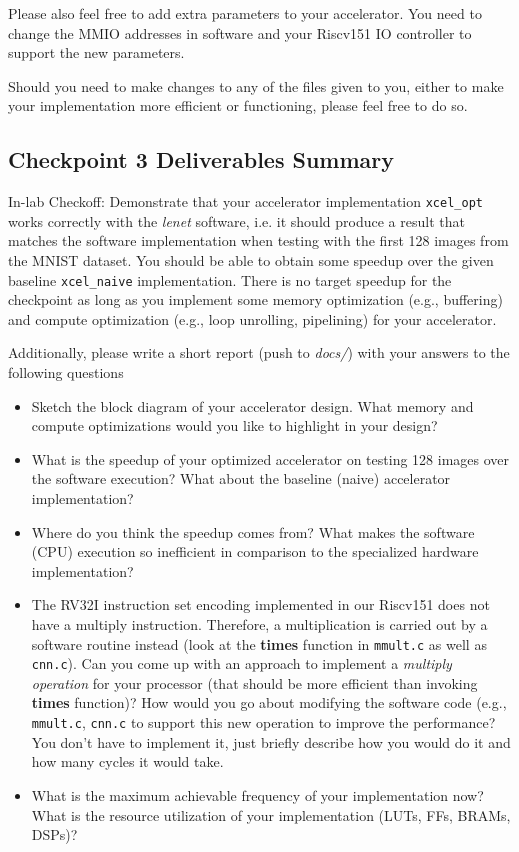 \documentclass[11pt]{article}
\begin{document}
Please also feel free to add extra parameters to your accelerator. You need to change the MMIO addresses in software and your Riscv151 IO controller to support the new parameters.

Should you need to make changes to any of the files given to you, either to make your implementation more efficient or functioning, please feel free to do so.

\newpage
\subsection{Checkpoint 3 Deliverables Summary}

In-lab Checkoff: Demonstrate that your accelerator implementation \verb|xcel_opt| works correctly with the \textit{lenet} software, i.e. it should produce a result that matches the software implementation when testing with the first 128 images from the MNIST dataset. You should be able to obtain some speedup over the given baseline \verb|xcel_naive| implementation. There is no target speedup for the checkpoint as long as you implement some memory optimization (e.g., buffering) and compute optimization (e.g., loop unrolling, pipelining) for your accelerator.

Additionally, please write a short report (push to \textit{docs/}) with your answers to the following questions
\begin{itemize}
\item Sketch the block diagram of your accelerator design. What memory and compute optimizations would you like to highlight in your design?
\item What is the speedup of your optimized accelerator on testing 128 images over the software execution? What about the baseline (naive) accelerator implementation?
\item Where do you think the speedup comes from? What makes the software (CPU) execution so inefficient in comparison to the specialized hardware implementation?
\item The RV32I instruction set encoding implemented in our Riscv151 does not have a multiply instruction. Therefore, a multiplication is carried out by a software routine instead (look at the \textbf{times} function in \texttt{mmult.c} as well as \texttt{cnn.c}). Can you come up with an approach to implement a \textit{multiply operation} for your processor (that should be more efficient than invoking \textbf{times} function)? How would you go about modifying the software code (e.g., \texttt{mmult.c}, \texttt{cnn.c} to support this new operation to improve the performance? You don't have to implement it, just briefly describe how you would do it and how many cycles it would take.

\item What is the maximum achievable frequency of your implementation now? What is the resource utilization of your implementation (LUTs, FFs, BRAMs, DSPs)?
\end{itemize}
\end{document}
